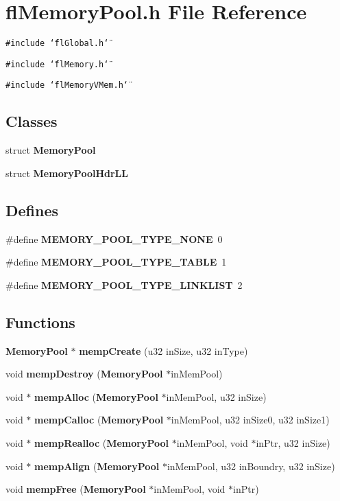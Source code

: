 \section{fl\-Memory\-Pool.h File Reference}
\label{flMemoryPool_8h}
{\tt \#include \char`\"{}fl\-Global.h\char`\"{}}\par
{\tt \#include \char`\"{}fl\-Memory.h\char`\"{}}\par
{\tt \#include \char`\"{}fl\-Memory\-VMem.h\char`\"{}}\par
\subsection*{Classes}
\begin{CompactItemize}
\item 
struct {\bf Memory\-Pool}
\item 
struct {\bf Memory\-Pool\-Hdr\-LL}
\end{CompactItemize}
\subsection*{Defines}
\begin{CompactItemize}
\item 
\#define {\bf MEMORY\_\-POOL\_\-TYPE\_\-NONE}~0
\item 
\#define {\bf MEMORY\_\-POOL\_\-TYPE\_\-TABLE}~1
\item 
\#define {\bf MEMORY\_\-POOL\_\-TYPE\_\-LINKLIST}~2
\end{CompactItemize}
\subsection*{Functions}
\begin{CompactItemize}
\item 
{\bf Memory\-Pool} $\ast$ {\bf memp\-Create} (u32 in\-Size, u32 in\-Type)
\item 
void {\bf memp\-Destroy} ({\bf Memory\-Pool} $\ast$in\-Mem\-Pool)
\item 
void $\ast$ {\bf memp\-Alloc} ({\bf Memory\-Pool} $\ast$in\-Mem\-Pool, u32 in\-Size)
\item 
void $\ast$ {\bf memp\-Calloc} ({\bf Memory\-Pool} $\ast$in\-Mem\-Pool, u32 in\-Size0, u32 in\-Size1)
\item 
void $\ast$ {\bf memp\-Realloc} ({\bf Memory\-Pool} $\ast$in\-Mem\-Pool, void $\ast$in\-Ptr, u32 in\-Size)
\item 
void $\ast$ {\bf memp\-Align} ({\bf Memory\-Pool} $\ast$in\-Mem\-Pool, u32 in\-Boundry, u32 in\-Size)
\item 
void {\bf memp\-Free} ({\bf Memory\-Pool} $\ast$in\-Mem\-Pool, void $\ast$in\-Ptr)
\end{CompactItemize}



